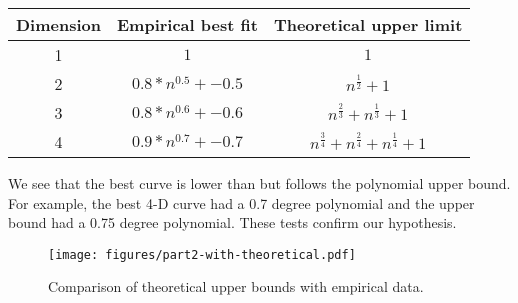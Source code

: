 \begin{tabular}{|c|c|c|}
\hline
Dimension&Empirical best fit&Theoretical upper limit\\
\hline
1&$1$&$1$\\
2&$0.8*n^{0.5} + -0.5$&$n^{\frac{1}{2}} + 1$\\
3&$0.8*n^{0.6} + -0.6$&$n^{\frac{2}{3}} + n^{\frac{1}{3}} + 1$\\
4&$0.9*n^{0.7} + -0.7$&$n^{\frac{3}{4}} + n^{\frac{2}{4}} + n^{\frac{1}{4}} + 1$\\
\hline
\end{tabular}

We see that the best curve is lower than but follows the polynomial upper
bound. For example, the best 4-D curve had a 0.7 degree polynomial and the
upper bound had a 0.75 degree polynomial. These tests confirm our
hypothesis.

\begin{figure}[htb!]
\centering
\texttt{[image: figures/part2-with-theoretical.pdf]}
\caption{Comparison of theoretical upper bounds with empirical data.}
\label{fig:part2-with-theoretical}
\end{figure}
